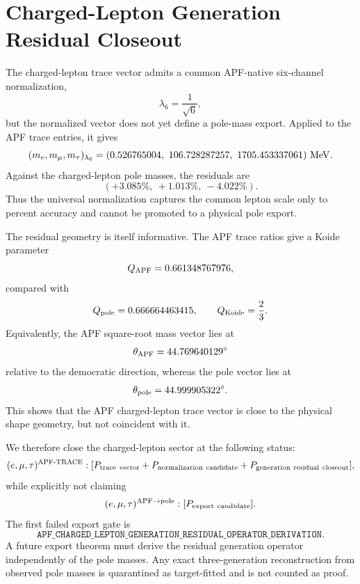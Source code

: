 
\section{Charged-Lepton Generation Residual Closeout}\label{sec:charged-lepton-residual-closeout}

The charged-lepton trace vector admits a common APF-native six-channel normalization,
\begin{equation}
  \lambda_6=\frac{1}{\sqrt{6}},
\end{equation}
but the normalized vector does not yet define a pole-mass export.  Applied to the APF trace entries, it gives
\begin{equation}
  (m_e,m_\mu,m_\tau)_{\lambda_6}
  =(0.526765004,\ 106.728287257,\ 1705.453337061)\ {\rm MeV}.
\end{equation}
Against the charged-lepton pole masses, the residuals are
\begin{equation}
  (+3.085\%,\ +1.013\%,\ -4.022\%).
\end{equation}
Thus the universal normalization captures the common lepton scale only to percent accuracy and cannot be promoted to a physical pole export.

The residual geometry is itself informative.  The APF trace ratios give a Koide parameter
\begin{equation}
  Q_{\rm APF}=0.661348767976,
\end{equation}
compared with
\begin{equation}
  Q_{\rm pole}=0.666664463415,
  \qquad Q_{\rm Koide}=\frac{2}{3}.
\end{equation}
Equivalently, the APF square-root mass vector lies at
\begin{equation}
  \theta_{\rm APF}=44.769640129^\circ
\end{equation}
relative to the democratic direction, whereas the pole vector lies at
\begin{equation}
  \theta_{\rm pole}=44.999905322^\circ.
\end{equation}
This shows that the APF charged-lepton trace vector is close to the physical shape geometry, but not coincident with it.

We therefore close the charged-lepton sector at the following status:
\begin{equation}
  (e,\mu,\tau)^{\rm APF\text{-}TRACE}:
  [P_{\rm trace\ vector}+P_{\rm normalization\ candidate}+P_{\rm generation\ residual\ closeout}],
\end{equation}
while explicitly not claiming
\begin{equation}
  (e,\mu,\tau)^{\rm APF\to pole}:[P_{\rm export\ candidate}].
\end{equation}
The first failed export gate is
\begin{equation}
  \texttt{APF\_CHARGED\_LEPTON\_GENERATION\_RESIDUAL\_OPERATOR\_DERIVATION}.
\end{equation}
A future export theorem must derive the residual generation operator independently of the pole masses.  Any exact three-generation reconstruction from observed pole masses is quarantined as target-fitted and is not counted as proof.
